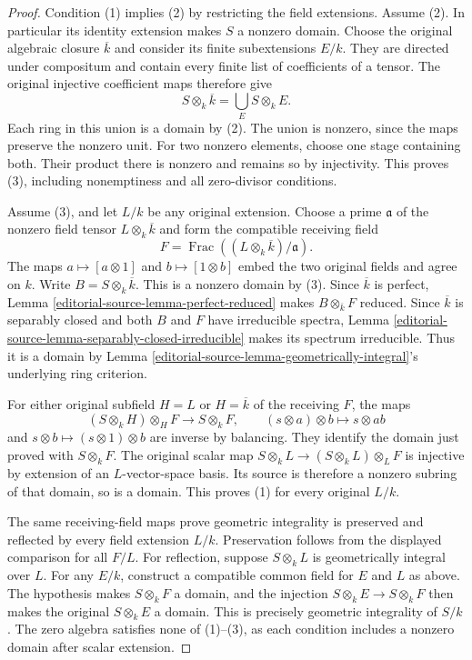 \begin{proof}
Condition (1) implies (2) by
restricting the field extensions.
Assume (2). In particular its
identity extension makes $S$
a nonzero domain. Choose the
original algebraic closure
$\overline k$ and consider its
finite subextensions $E/k$.
They are directed under compositum
and contain every finite list
of coefficients of a tensor.
The original injective coefficient
maps therefore give
$$
S\otimes_k\overline k=\bigcup_E S\otimes_k E.
$$
Each ring in this union is a
domain by (2). The union is
nonzero, since the maps preserve
the nonzero unit. For two
nonzero elements, choose one
stage containing both. Their
product there is nonzero and
remains so by injectivity.
This proves (3), including
nonemptiness and all zero-divisor
conditions.

Assume (3), and let $L/k$
be any original extension.
Choose a prime $\mathfrak a$
of the nonzero field tensor
$L\otimes_k\overline k$ and
form the compatible receiving
field
$$
F=\operatorname{Frac}((L\otimes_k\overline k)/\mathfrak a).
$$
The maps $a\mapsto[a\otimes1]$
and $b\mapsto[1\otimes b]$
embed the two original fields
and agree on $k$. Write
$B=S\otimes_k\overline k$.
This is a nonzero domain
by (3). Since $\overline k$
is perfect, Lemma
\ref{editorial-source-lemma-perfect-reduced}
makes $B\otimes_{\overline k}F$
reduced. Since $\overline k$
is separably closed and both
$B$ and $F$ have irreducible
spectra, Lemma
\ref{editorial-source-lemma-separably-closed-irreducible}
makes its spectrum irreducible.
Thus it is a domain by Lemma
\ref{editorial-source-lemma-geometrically-integral}'s
underlying ring criterion.

For either original subfield
$H=L$ or $H=\overline k$ of
the receiving $F$, the maps
$$
(S\otimes_k H)\otimes_H F\longrightarrow S\otimes_k F,
\qquad(s\otimes a)\otimes b\longmapsto s\otimes ab
$$
and $s\otimes b\mapsto(s\otimes1)\otimes b$
are inverse by balancing.
They identify the domain just
proved with $S\otimes_k F$.
The original scalar map
$S\otimes_k L\to(S\otimes_k L)\otimes_L F$
is injective by extension of
an $L$-vector-space basis.
Its source is therefore a
nonzero subring of that domain,
so is a domain. This proves
(1) for every original $L/k$.

The same receiving-field maps
prove geometric integrality
is preserved and reflected
by every field extension
$L/k$. Preservation follows
from the displayed comparison
for all $F/L$. For reflection,
suppose $S\otimes_k L$ is
geometrically integral over $L$.
For any $E/k$, construct a
compatible common field for
$E$ and $L$ as above. The
hypothesis makes $S\otimes_k F$
a domain, and the injection
$S\otimes_k E\to S\otimes_k F$
then makes the original
$S\otimes_k E$ a domain.
This is precisely geometric
integrality of $S/k$.
The zero algebra satisfies
none of (1)--(3), as each
condition includes a nonzero
domain after scalar extension.
\end{proof}


